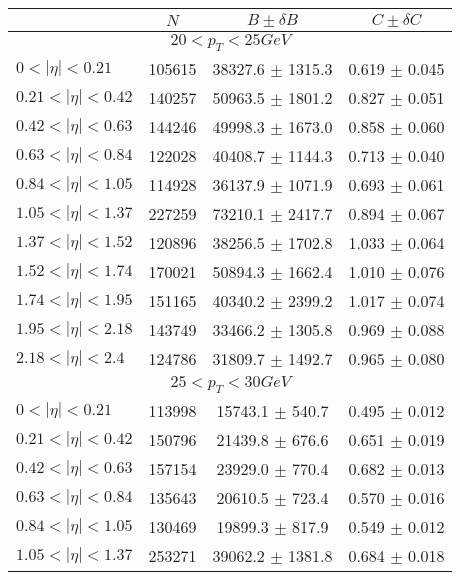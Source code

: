 \begin{tabular}{lccc}
\hline
    &   $N$   & $B \pm \delta B$  &  $C \pm \delta C$ \\
\hline
\hline
\multicolumn{4}{c}{$20 < p_{T} < 25 GeV$} \\
\hline
$0 < |\eta| <0.21$             & 105615     & 38327.6    $\pm$ 1315.3 & 0.619      $\pm$ 0.045 \\
$0.21 < |\eta| <0.42$          & 140257     & 50963.5    $\pm$ 1801.2 & 0.827      $\pm$ 0.051 \\
$0.42 < |\eta| <0.63$          & 144246     & 49998.3    $\pm$ 1673.0 & 0.858      $\pm$ 0.060 \\
$0.63 < |\eta| <0.84$          & 122028     & 40408.7    $\pm$ 1144.3 & 0.713      $\pm$ 0.040 \\
$0.84 < |\eta| <1.05$          & 114928     & 36137.9    $\pm$ 1071.9 & 0.693      $\pm$ 0.061 \\
$1.05 < |\eta| <1.37$          & 227259     & 73210.1    $\pm$ 2417.7 & 0.894      $\pm$ 0.067 \\
$1.37 < |\eta| <1.52$          & 120896     & 38256.5    $\pm$ 1702.8 & 1.033      $\pm$ 0.064 \\
$1.52 < |\eta| <1.74$          & 170021     & 50894.3    $\pm$ 1662.4 & 1.010      $\pm$ 0.076 \\
$1.74 < |\eta| <1.95$          & 151165     & 40340.2    $\pm$ 2399.2 & 1.017      $\pm$ 0.074 \\
$1.95 < |\eta| <2.18$          & 143749     & 33466.2    $\pm$ 1305.8 & 0.969      $\pm$ 0.088 \\
$2.18 < |\eta| <2.4$           & 124786     & 31809.7    $\pm$ 1492.7 & 0.965      $\pm$ 0.080 \\
\hline
\multicolumn{4}{c}{$25 < p_{T} < 30 GeV$} \\
\hline
$0 < |\eta| <0.21$             & 113998     & 15743.1    $\pm$ 540.7 & 0.495      $\pm$ 0.012 \\
$0.21 < |\eta| <0.42$          & 150796     & 21439.8    $\pm$ 676.6 & 0.651      $\pm$ 0.019 \\
$0.42 < |\eta| <0.63$          & 157154     & 23929.0    $\pm$ 770.4 & 0.682      $\pm$ 0.013 \\
$0.63 < |\eta| <0.84$          & 135643     & 20610.5    $\pm$ 723.4 & 0.570      $\pm$ 0.016 \\
$0.84 < |\eta| <1.05$          & 130469     & 19899.3    $\pm$ 817.9 & 0.549      $\pm$ 0.012 \\
$1.05 < |\eta| <1.37$          & 253271     & 39062.2    $\pm$ 1381.8 & 0.684      $\pm$ 0.018 \\

\end{tabular}
